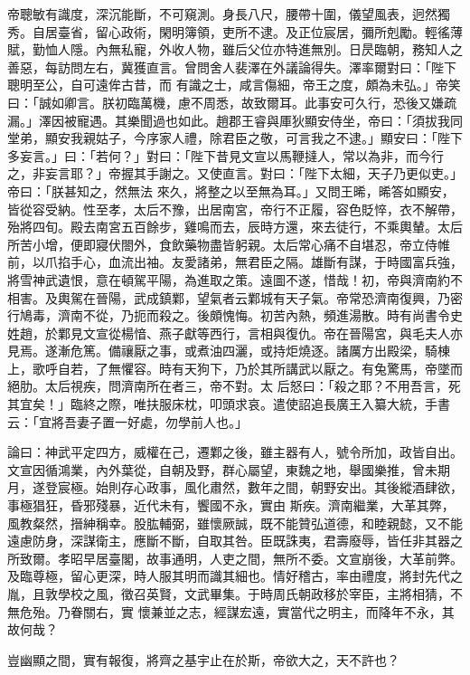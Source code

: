 \begin{pinyinscope}
 帝聰敏有識度，深沉能斷，不可窺測。身長八尺，腰帶十圍，儀望風表，迥然獨秀。自居臺省，留心政術，閑明簿領，吏所不逮。及正位宸居，彌所剋勵。輕徭薄賦，勤恤人隱。內無私寵，外收人物，雖后父位亦特進無別。日昃臨朝，務知人之善惡，每訪問左右，冀獲直言。曾問舍人裴澤在外議論得失。澤率爾對曰：「陛下聰明至公，自可遠侔古昔，而
 有識之士，咸言傷細，帝王之度，頗為未弘。」帝笑曰：「誠如卿言。朕初臨萬機，慮不周悉，故致爾耳。此事安可久行，恐後又嫌疏漏。」澤因被寵遇。其樂聞過也如此。趙郡王睿與厙狄顯安侍坐，帝曰：「須拔我同堂弟，顯安我親姑子，今序家人禮，除君臣之敬，可言我之不逮。」顯安曰：「陛下多妄言。」曰：「若何？」對曰：「陛下昔見文宣以馬鞭撻人，常以為非，而今行之，非妄言耶？」帝握其手謝之。又使直言。對曰：「陛下太細，天子乃更似吏。」帝曰：「朕甚知之，然無法
 來久，將整之以至無為耳。」又問王晞，晞答如顯安，皆從容受納。性至孝，太后不豫，出居南宮，帝行不正履，容色貶悴，衣不解帶，殆將四旬。殿去南宮五百餘步，雞鳴而去，辰時方還，來去徒行，不乘輿輦。太后所苦小增，便即寢伏閤外，食飲藥物盡皆躬親。太后常心痛不自堪忍，帝立侍帷前，以爪掐手心，血流出袖。友愛諸弟，無君臣之隔。雄斷有謀，于時國富兵強，將雪神武遺恨，意在頓駕平陽，為進取之策。遠圖不遂，惜哉！初，帝與濟南約不
 相害。及輿駕在晉陽，武成鎮鄴，望氣者云鄴城有天子氣。帝常恐濟南復興，乃密行鳩毒，濟南不從，乃扼而殺之。後頗愧悔。初苦內熱，頻進湯散。時有尚書令史姓趙，於鄴見文宣從楊愔、燕子獻等西行，言相與復仇。帝在晉陽宮，與毛夫人亦見焉。遂漸危篤。備禳厭之事，或煮油四灑，或持炬燒逐。諸厲方出殿梁，騎棟上，歌呼自若，了無懼容。時有天狗下，乃於其所講武以厭之。有兔驚馬，帝墜而絕肋。太后視疾，問濟南所在者三，帝不對。太
 后怒曰：「殺之耶？不用吾言，死其宜矣！」臨終之際，唯扶服床枕，叩頭求哀。遣使詔追長廣王入纂大統，手書云：「宜將吾妻子置一好處，勿學前人也。」



 論曰：神武平定四方，威權在己，遷鄴之後，雖主器有人，號令所加，政皆自出。文宣因循鴻業，內外葉從，自朝及野，群心屬望，東魏之地，舉國樂推，曾未期月，遂登宸極。始則存心政事，風化肅然，數年之間，朝野安出。其後縱酒肆欲，事極猖狂，昏邪殘暴，近代未有，饗國不永，實由
 斯疾。濟南繼業，大革其弊，風教粲然，搢紳稱幸。股肱輔弼，雖懷厥誠，既不能贊弘道德，和睦親懿，又不能遠慮防身，深謀衛主，應斷不斷，自取其咎。臣既誅夷，君壽廢辱，皆任非其器之所致爾。孝昭早居臺閣，故事通明，人吏之間，無所不委。文宣崩後，大革前弊。及臨尊極，留心更深，時人服其明而識其細也。情好稽古，率由禮度，將封先代之胤，且敦學校之風，徵召英賢，文武畢集。于時周氏朝政移於宰臣，主將相猜，不無危殆。乃眷關右，實
 懷兼並之志，經謀宏遠，實當代之明主，而降年不永，其故何哉？



 豈幽顯之間，實有報復，將齊之基宇止在於斯，帝欲大之，天不許也？



\end{pinyinscope}